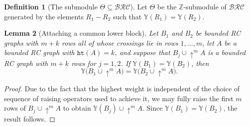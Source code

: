 \documentclass{amsart}
\newtheorem{lemma}{Lemma}[subsection]
\newtheorem{proposition}[lemma]{Proposition}
\theoremstyle{definition}
\newtheorem{definition}[lemma]{Definition}
\theoremstyle{remark}
\numberwithin{equation}{subsection}
\newcommand{\shup}{{\uparrow}}
\newcommand{\wtt}{\mathtt{wt}}
\newcommand{\hr}{\mathtt{ht}}
\newcommand{\BRC}{\mathcal{BRC}}
\newcommand{\RC}{\mathcal{RC}}
\begin{document}

\begin{definition}[The submodule $\Theta\subseteq \BRC$]\label{definition:theta}
  Let $\Theta$ be the $\mathbb{Z}$-submodule of $\BRC$ generated by the elements $R_1-R_2$ such that $\mathbb{Y}(R_1)=\mathbb{Y}(R_2)$.

\end{definition}

\begin{lemma}[Attaching a common lower block]\label{lemma:lowerblockattach}
Let $B_1$ and $B_2$ be bounded RC graphs with $m+k$ rows all of whose crossings lie in rows $1,\ldots,m$, let $A$ be a bounded RC graph with $\hr(A)=k$, and suppose that $B_j\cup\shup^{m}A$ is a bounded RC graph with $m+k$ rows for $j=1,2$. If $\mathbb{Y}(B_1)=\mathbb{Y}(B_2)$, then
$$\mathbb{Y}\bigl(B_1\cup\shup^{m}A\bigr)=\mathbb{Y}\bigl(B_2\cup\shup^{m}A\bigr).$$
\end{lemma}
\begin{proof}
  Due to the fact that the highest weight is independent of the choice of sequence of raising operators used to achieve it, we may fully raise the first $m$ rows of $B_j\cup\shup^{m}A$ to obtain $\mathbb{Y}(B_j)\cup\shup^{m}A$. Since $\mathbb{Y}(B_1)=\mathbb{Y}(B_2)$, the result follows.
\end{proof}
\end{document}
